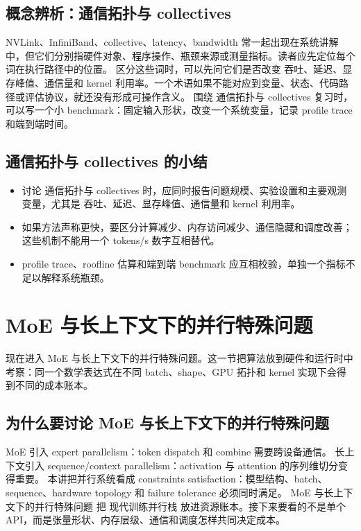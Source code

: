\documentclass[a4paper]{article}
\begin{document}
\subsection{概念辨析：通信拓扑与 collectives}
NVLink、InfiniBand、collective、latency、bandwidth 常一起出现在系统讲解中，但它们分别指硬件对象、程序操作、瓶颈来源或测量指标。读者应先定位每个词在执行路径中的位置。
区分这些词时，可以先问它们是否改变 吞吐、延迟、显存峰值、通信量和 kernel 利用率。一个术语如果不能对应到变量、状态、代码路径或评估协议，就还没有形成可操作含义。
围绕 通信拓扑与 collectives 复习时，可以写一个小 benchmark：固定输入形状，改变一个系统变量，记录 profile trace 和端到端时间。
\subsection{通信拓扑与 collectives 的小结}
\begin{itemize}
\item 讨论 通信拓扑与 collectives 时，应同时报告问题规模、实验设置和主要观测变量，尤其是 吞吐、延迟、显存峰值、通信量和 kernel 利用率。
\item 如果方法声称更快，要区分计算减少、内存访问减少、通信隐藏和调度改善；这些机制不能用一个 tokens/s 数字互相替代。
\item profile trace、roofline 估算和端到端 benchmark 应互相校验，单独一个指标不足以解释系统瓶颈。
\end{itemize}
\section{MoE 与长上下文下的并行特殊问题}
现在进入 MoE 与长上下文下的并行特殊问题。这一节把算法放到硬件和运行时中考察：同一个数学表达式在不同 batch、shape、GPU 拓扑和 kernel 实现下会得到不同的成本账本。
\subsection{为什么要讨论 MoE 与长上下文下的并行特殊问题}
MoE 引入 expert parallelism：token dispatch 和 combine 需要跨设备通信。
长上下文引入 sequence/context parallelism：activation 与 attention 的序列维切分变得重要。
本讲把并行系统看成 constraints satisfaction：模型结构、batch、sequence、hardware topology 和 failure tolerance 必须同时满足。
MoE 与长上下文下的并行特殊问题 把 现代训练并行栈 放进资源账本。接下来要看的不是单个 API，而是张量形状、内存层级、通信和调度怎样共同决定成本。
\end{document}
